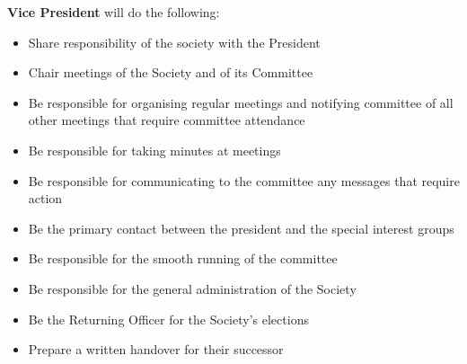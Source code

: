 \begin{subclause}
  \textbf{Vice President} will do the following:
  \begin{itemize}[label=--,topsep=0em,itemsep=0em]
    \item Share responsibility of the society with the President
    \item Chair meetings of the Society and of its Committee
    \item Be responsible for organising regular meetings and notifying committee of all other meetings that require committee attendance
    \item Be responsible for taking minutes at meetings
    \item Be responsible for communicating to the committee any messages that require action
    \item Be the primary contact between the president and the special interest groups
    \item Be responsible for the smooth running of the committee
    \item Be responsible for the general administration of the Society
    \item Be the Returning Officer for the Society's elections
    \item Prepare a written handover for their successor
  \end{itemize}
\end{subclause}
